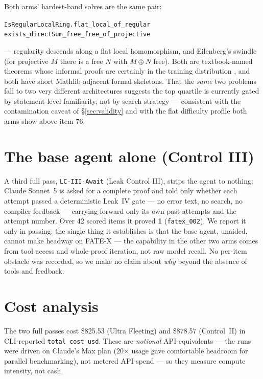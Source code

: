 \documentclass[12pt, a4paper]{article}
\newcommand{\run}[1]{\texttt{#1}}
\begin{document}
Both arms' hardest-band solves are the same pair:
\begin{center}\small
\run{IsRegularLocalRing.flat\_local\_of\_regular}\\
\run{exists\_directSum\_free\_free\_of\_projective}
\end{center}
\noindent
--- regularity descends along a flat local homomorphism, and Eilenberg's
swindle (for projective $M$ there is a free $N$ with $M \oplus N$ free). Both are
textbook-named theorems whose informal proofs are certainly in the training
distribution \cite{anthropic2026sonnet5}, and both have short Mathlib-adjacent
formal skeletons. That the \emph{same} two problems fall to two very
different architectures suggests the top quartile is currently gated by
statement-level familiarity, not by search strategy --- consistent with the
contamination caveat of \S\ref{sec:validity} and with the flat difficulty
profile both arms show above item 76.

\section{The base agent alone (Control III)}

A third full pass, \run{LC-III-Await} (Leak Control III), strips the agent to
nothing: Claude Sonnet~5 is asked for a complete proof and told only whether
each attempt passed a deterministic Leak~IV gate --- no error text, no search,
no compiler feedback --- carrying forward only its own past attempts and the
attempt number. Over 42 scored items it proved \textbf{1} (\run{fatex\_002}).
We report it only in passing: the single thing it establishes is that the base
agent, unaided, cannot make headway on FATE-X --- the capability in the other
two arms comes from tool access and whole-proof iteration, not raw model
recall. No per-item obstacle was recorded, so we make no claim about \emph{why}
beyond the absence of tools and feedback.

\section{Cost analysis}
\label{sec:cost}

The two full passes cost \$825.53 (Ultra Fleeting) and \$878.57 (Control~II) in
CLI-reported \texttt{total\_cost\_usd}. These are \emph{notional}
API-equivalents --- the runs were driven on Claude's Max plan (20$\times$ usage
gave comfortable headroom for parallel benchmarking), not metered API spend ---
so they measure compute intensity, not cash.
\end{document}
